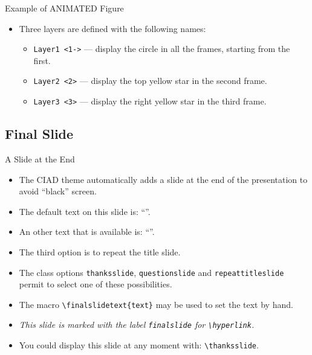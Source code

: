 \documentclass[english,sectioncirclenumberstyle]{ciadbeamer}
\begin{document}
\begin{frame}{Example of ANIMATED Figure}
	\begin{itemize}
	\item Three layers are defined with the following names:
		\begin{itemize}
		\item \texttt{Layer1 <1->} --- display the circle in all the frames, starting from the first.
		\item \texttt{Layer2 <2>} --- display the top yellow star in the second frame.
		\item \texttt{Layer3 <3>} --- display the right yellow star in the third frame.
		\end{itemize}
	\end{itemize}
	\begin{center}
	\end{center}
\end{frame}

\subsection{Final Slide}

\begin{frame}{A Slide at the End}
	\begin{itemize}
	\item The CIAD theme automatically adds a slide at the end of the presentation to avoid ``black'' screen.
	\vfill
	\item The default text on this slide is: ``''.
	\item An other text that is available is: ``''.
	\item The third option is to repeat the title slide.
	\vfill
	\item The class options \texttt{thanksslide}, \texttt{questionslide} and \texttt{repeattitleslide} permit to select one of these possibilities.
	\vfill
	\item The macro \texttt{{\textbackslash}finalslidetext\{text\}} may be used to set the text by hand.
	\vfill
	\item \emph{This slide is marked with the label \texttt{finalslide} for \texttt{{\textbackslash}hyperlink}.}
	\vfill
	\item You could display this slide at any moment with: \texttt{{\textbackslash}thanksslide}.
	\end{itemize}
\end{frame}
\end{document}
